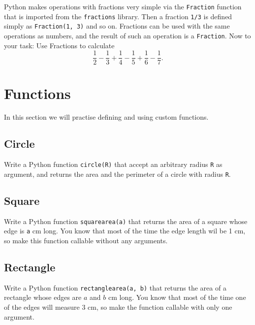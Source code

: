 Python makes operations with fractions very simple via the {\tt Fraction}
function that is imported from the {\tt fractions} library. Then 
a fraction {\tt 1/3} is defined simply as {\tt Fraction(1, 3)} and so on. Fractions
can be used with the same operations as numbers, and the result of such 
an operation is a {\tt Fraction}. Now to your task: Use Fractions to 
calculate
$$
\frac{1}{2} - \frac{1}{3} + \frac{1}{4} - \frac{1}{5} + \frac{1}{6} - \frac{1}{7}.
$$


\section{Functions}

In this section we will practise defining and using custom functions.

\subsection{Circle}

Write a Python function {\tt circle(R)} that accept an arbitrary radius {\tt R}
as argument, and returns the area and the perimeter of a circle with radius {\tt R}.


\subsection{Square}

Write a Python function {\tt squarearea(a)} that returns the area of a square whose 
edge is {\tt a} cm long. You know that most of the time the edge length wil be 1 cm,
so make this function callable without any arguments.


\subsection{Rectangle}

Write a Python function {\tt rectanglearea(a, b)} that returns the area of a rectangle 
whose edges are $a$ and $b$ cm long. You know that most of the time one of the edges 
will measure 3 cm, so make the function callable with only one argument.

